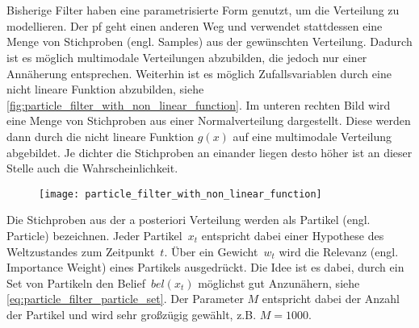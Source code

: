 %
%
\section{}

Bisherige Filter haben eine parametrisierte Form genutzt, um die Verteilung zu modellieren. Der \Gls{pf} geht einen anderen Weg und verwendet stattdessen eine Menge von Stichproben (engl. Samples) aus der gewünschten Verteilung. Dadurch ist es möglich multimodale Verteilungen abzubilden, die jedoch nur einer Annäherung entsprechen. Weiterhin ist es möglich Zufallsvariablen durch eine nicht lineare Funktion abzubilden, siehe \autoref {fig:particle_filter_with_non_linear_function}. Im unteren rechten Bild wird eine Menge von Stichproben aus einer Normalverteilung dargestellt. Diese werden dann durch die nicht lineare Funktion $g(x)$ auf eine multimodale Verteilung abgebildet. Je dichter die Stichproben an einander liegen desto höher ist an dieser Stelle auch die Wahrscheinlichkeit.

\begin{figure}
	\centering
	\texttt{[image: particle\_filter\_with\_non\_linear\_function]}
	\label{fig:particle_filter_with_non_linear_function}
\end{figure}

Die Stichproben aus der a posteriori Verteilung werden als Partikel (engl. Particle) bezeichnen. Jeder Partikel~$x_t$ entspricht dabei einer Hypothese des Weltzustandes zum Zeitpunkt~$t$. Über ein Gewicht~$w_t$ wird die Relevanz (engl. Importance Weight) eines Partikels ausgedrückt. Die Idee ist es dabei, durch ein Set von Partikeln den Belief~$bel(x_t)$ möglichst gut Anzunähern, siehe \autoref{eq:particle_filter_particle_set}. Der Parameter $M$ entspricht dabei der Anzahl der Partikel und wird sehr großzügig gewählt, z.B. $M=1000$.

